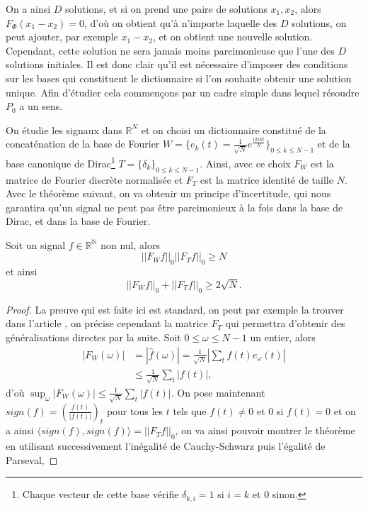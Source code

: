 On a ainsi $D$ solutions, et si on prend une paire de solutions $x_1, x_2$, alors $F_\Phi(x_1 - x_2) = 0$, d'où on obtient qu'à n'importe laquelle des $D$ solutions, on peut ajouter, par exemple $x_1 - x_2$, et on obtient une nouvelle solution. 
Cependant, cette solution ne sera jamais moins parcimonieuse que l'une des $D$ solutions initiales.
Il est donc clair qu'il est nécessaire d'imposer des conditions sur les bases qui constituent le dictionnaire si l'on souhaite obtenir une solution unique.
Afin d'étudier cela commençons par un cadre simple dans lequel résoudre $P_0$ a un sens.
\begin{exemple}
	On étudie les signaux dans $\mathbb{R}^N$ et on choisi un dictionnaire constitué de la concaténation de la base de Fourier $ W = \{e_k(t) = \frac{1}{\sqrt{N}} e^{\frac{i 2\pi k t}{N}}\}_{0 \leq k \leq N -1}$ et de la base canonique de Dirac\footnote{Chaque vecteur de cette base vérifie $\delta_{k,i} = 1$ si $i = k$ et 0 sinon.} $T = \{\delta_k\}_{0 \leq k \leq N-1}$.
	Ainsi, avec ce choix $F_W$ est la matrice de Fourier discrète normalisée et $F_T$ est la matrice identité de taille $N$.
	Avec le théorème suivant, on va obtenir un principe d'incertitude, qui nous garantira qu'un signal ne peut pas être parcimonieux à la fois dans la base de Dirac, et dans la base de Fourier.
	\begin{theoreme}\label{th:Incert1}
		Soit un signal $f\in \mathbb{R^N}$ non nul, alors
		\begin{equation}
			||F_W f||_0 ||F_T f||_0 \geq N 	
		\end{equation}
		et ainsi
		\begin{equation}
			||F_W f||_0 + ||F_T f||_0 \geq 2 \sqrt{N}. 	
		\end{equation}
	\end{theoreme}
	\begin{proof}
		La preuve qui est faite ici est standard, on peut par exemple la trouver dans l'article \cite{taoprime}, on précise cependant la matrice $F_T$ qui permettra d'obtenir des généralisations directes par la suite.
		Soit $0 \leq \omega \leq N-1$ un entier, alors 
		\begin{align}
			|F_W(\omega)| &= |\hat{f}(\omega)| = \frac{1}{\sqrt{N}}|\sum_t f(t)e_\omega(t)| \\
				&\leq \frac{1}{\sqrt{N}}\sum_t |f(t)|,
		\end{align}
		d'où $\sup_\omega |F_W(\omega)| \leq \frac{1}{\sqrt{N}} \sum_t |f(t)|$.
		On pose maintenant $sign(f) = (\frac{f(t)}{|f(t)|})_t$ pour tous les $t$ tels que $f(t) \neq 0$ et 0 si $f(t) = 0$ et on a ainsi $\langle sign(f), sign(f) \rangle = ||F_T f||_0$, on va ainsi pouvoir montrer le théorème en utilisant successivement l'inégalité de Cauchy-Schwarz puis l'égalité de Parseval,

\end{proof}
\end{exemple}
